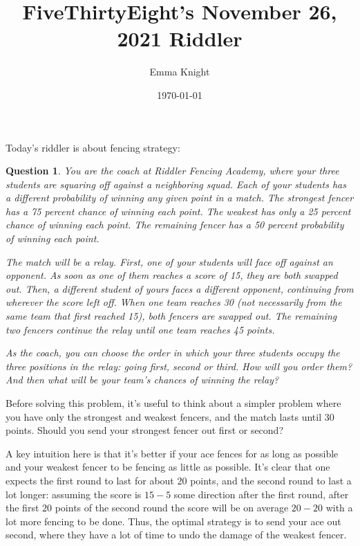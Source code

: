 \documentclass[11pt]{article}
\title{FiveThirtyEight's November 26, 2021 Riddler}
\author{Emma Knight}
\date{\today}
\newtheorem{question}[theorem]{Question}
\theoremstyle{definition}
\begin{document}
\maketitle
Today's riddler is about fencing strategy:
\begin{question}
You are the coach at Riddler Fencing Academy, where your three students are squaring off against a neighboring squad. Each of your students has a different probability of winning any given point in a match. The strongest fencer has a 75 percent chance of winning each point. The weakest has only a 25 percent chance of winning each point. The remaining fencer has a 50 percent probability of winning each point.

The match will be a relay. First, one of your students will face off against an opponent. As soon as one of them reaches a score of 15, they are both swapped out. Then, a different student of yours faces a different opponent, continuing from wherever the score left off. When one team reaches 30 (not necessarily from the same team that first reached 15), both fencers are swapped out. The remaining two fencers continue the relay until one team reaches 45 points.

As the coach, you can choose the order in which your three students occupy the three positions in the relay: going first, second or third. How will you order them? And then what will be your team’s chances of winning the relay?
\end{question}
Before solving this problem, it's useful to think about a simpler problem where you have only the strongest and weakest fencers, and the match lasts until 30 points.  Should you send your strongest fencer out first or second?

A key intuition here is that it's better if your ace fences for as long as possible and your weakest fencer to be fencing as little as possible.  It's clear that one expects the first round to last for about 20 points, and the second round to last a lot longer: assuming the score is $15-5$ some direction after the first round, after the first $20$ points of the second round the score will be on average $20-20$ with a lot more fencing to be done.  Thus, the optimal strategy is to send your ace out second, where they have a lot of time to undo the damage of the weakest fencer.
\end{document}
